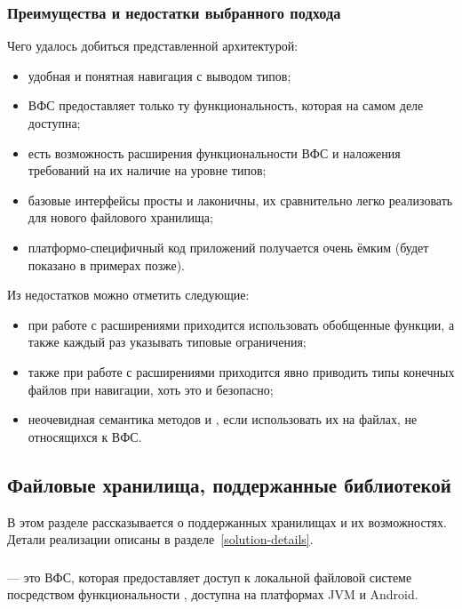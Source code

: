   \subsubsection{Преимущества и недостатки выбранного подхода}
    Чего удалось добиться представленной архитектурой:
    \begin{itemize}
      \item удобная и понятная навигация с выводом типов;
      \item ВФС предоставляет только ту функциональность, которая на самом деле доступна;
      \item есть возможность расширения функциональности ВФС и наложения требований на их наличие на уровне типов;
      \item базовые интерфейсы просты и лаконичны, их сравнительно легко реализовать для нового файлового хранилища;
      \item платформо-специфичный код приложений получается очень ёмким (будет показано в примерах позже).
    \end{itemize}
    Из недостатков можно отметить следующие:
    \begin{itemize}
      \item при работе с расширениями приходится использовать обобщенные функции, а также каждый раз указывать типовые ограничения;
      \item также при работе с расширениями приходится явно приводить типы конечных файлов при навигации, хоть это и безопасно;
      \item неочевидная семантика методов  и , если использовать их на файлах, не относящихся к ВФС.
    \end{itemize}


\subsection{Файловые хранилища, поддержанные библиотекой}
  В этом разделе рассказывается о поддержанных хранилищах и их возможностях. Детали реализации описаны в разделе~\ref{solution-details}.

  \subsubsection{}
     --- это ВФС, которая предоставляет доступ к локальной файловой системе посредством функциональности , доступна на платформах JVM и Android.

